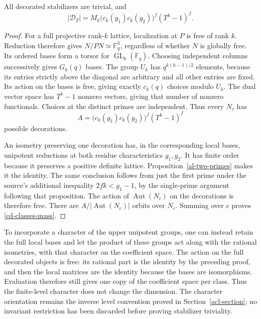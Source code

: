 \begin{lemma}\label{cd-decoration-count}
All decorated stabilizers are trivial, and
\begin{equation}\label{cd-classes-mass}
             |\mathcal D_T|
                 =M_k\bigl(c_k(g_1)c_k(g_2)\bigr)^f(T^k-1)^f.
\end{equation}
\end{lemma}
\begin{proof}
For a full projective rank-$k$ lattice, localization at $P$
is free of rank $k$. Reduction therefore gives
$N/PN\simeq\mathbb F_q^k$, regardless of whether $N$ is
globally free. Its ordered bases form a torsor for
$\operatorname{GL}_k(\mathbb F_q)$. Choosing independent
columns successively gives $G_k(q)$ bases. The group $U_k$
has $q^{k(k-1)/2}$ elements, because its entries strictly above
the diagonal are arbitrary and all other entries are fixed.
Its action on the bases is free, giving exactly $c_k(q)$
choices modulo $U_k$. The dual vector space has $T^k-1$
nonzero vectors, giving that number of nonzero functionals.
Choices at the distinct primes are independent. Thus every
$N_c$ has
\[
                 A=\bigl(c_k(g_1)c_k(g_2)\bigr)^f(T^k-1)^f
\]
possible decorations.

An isometry preserving one decoration has, in the corresponding
local bases, unipotent reductions at both residue characteristics
$g_1,g_2$. It has finite order because it preserves a positive
definite lattice. Proposition~\ref{al-two-primes} makes it the
identity. The same conclusion follows from just the first prime
under the source's additional inequality $2fk<g_1-1$, by the
single-prime argument following that proposition.
The action of $\operatorname{Aut}(N_c)$ on the decorations is
therefore free. There are $A/|\operatorname{Aut}(N_c)|$ orbits
over $N_c$. Summing over $c$ proves \eqref{cd-classes-mass}.
\end{proof}

To incorporate a character of the upper unipotent groups, one
can instead retain the full local bases and let the product of
these groups act along with the rational isometries, with that
character on the coefficient space. The action on the full
decorated objects is free: its rational part is the identity
by the preceding proof, and then the local matrices are the
identity because the bases are isomorphisms. Evaluation therefore
still gives one copy of the coefficient space per class. Thus
the finite-level character does not change the dimension.
The character orientation remains the inverse level convention
proved in Section~\ref{acl-section}; no invariant restriction has
been discarded before proving stabilizer triviality.

